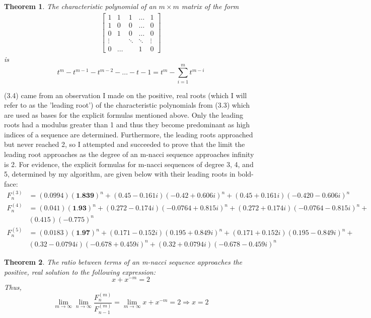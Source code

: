 \documentclass{article}
\newtheorem{theorem}{Theorem}[section]
\begin{document}
\begin{theorem}
    The characteristic polynomial of an $m\times m$ matrix of the form 
    \begin{align*}
    \begin{bmatrix} 
        1 & 1 & 1 & \dots & 1 \\
        1 & 0 & 0 & \dots & 0 \\
        0 & 1 & 0 & \dots & 0 \\
        \vdots & & \ddots & \ddots  & \vdots \\ 
        0 & \dots & & 1 & 0
    \end{bmatrix}
    \end{align*}
    is 
    $$t^m-t^{m-1}-t^{m-2}-\dots-t-1=t^m-\sum_{i=1}^m t^{m-i}$$
\end{theorem}

(3.4) came from an observation I made on the positive, real roots (which I will refer to as the 'leading root') of the characteristic polynomials from (3.3) which are used as bases for the explicit formulas mentioned above. Only the leading roots had a modulus greater than 1 and thus they become predominant as high indices of a sequence are determined. Furthermore, the leading roots approached but never reached 2, so I attempted and succeeded to prove that the limit the leading root approaches as the degree of an m-nacci sequence approaches infinity is 2.
For evidence, the explicit formulas for m-nacci sequences of degree 3, 4, and 5, determined by my algorithm, are given below with their leading roots in bold-face:
\begin{align*}
    F^{(3)}_n &= (0.0994)(\textbf{1.839})^n + (0.45 - 0.161i)(-0.42 + 0.606i)^n + (0.45 + 0.161i)(-0.420 - 0.606i)^n \\
    F^{(4)}_n &= (0.041)(\textbf{1.93})^n + (0.272 - 0.174i)(-0.0764 + 0.815i)^n + (0.272 + 0.174i)(-0.0764 - 0.815i)^n + \\ & (0.415)(-0.775)^n \\
    F^{(5)}_n &= (0.0183)(\textbf{1.97})^n + (0.171 - 0.152i)(0.195 + 0.849i)^n + (0.171 + 0.152i)(0.195 - 0.849i)^n + \\ & (0.32 - 0.0794i)(-0.678 + 0.459i)^n + (0.32 + 0.0794i)(-0.678 - 0.459i)^n
\end{align*}

\begin{theorem}
    The ratio between terms of an m-nacci sequence approaches the positive, real solution to the following expression:
    $$x+x^{-m}=2$$
    Thus, 
    $$\lim_{m \to \infty} \lim_{n \to \infty} \frac{F^{(m)}_n}{F^{(m)}_{n-1}}= \lim_{m \to \infty} x+x^{-m}=2 \Rightarrow x=2$$
\end{theorem}
\end{document}
